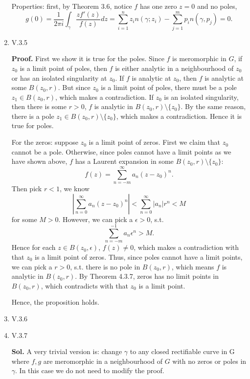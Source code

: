 \documentclass{article}%
\begin{document}
\begin{enumerate}
Properties: first, by Theorem 3.6, notice $f$ has one zero $z = 0$ and no poles,
$$
g(0) = \frac{1}{2\pi i}\int_{\gamma}\frac{zf'(z)}{f(z)}dz = \sum_{i=1}^{n}z_i n(\gamma; z_i) - \sum_{j=1}^{m}p_i n(\gamma, p_j) = 0.
$$

\item V.3.5

\textbf{Proof.}
First we show it is true for the poles. Since $f$ is meromorphic in $G$, if $z_0 $ is a limit point of poles, then $f$ is either analytic in a neighbourhood of $z_0 $ or has an isolated singularity at $z_0 $. If $f$ is analytic at $z_0 $, then $f$ is analytic at some $B(z_0, r)$. But since $z_0 $ is a limit point of poles, there must be a pole $z_1\in B(z_0, r)$, which makes a contradiction. If $z_0 $ is an isolated singularity, then there is some $r > 0$, $f$ is analytic in $B(z_0, r)\setminus\{z_0\}$. By the same reason, there is a pole $z_1\in B(z_0, r)\setminus\{z_0\}$, which makes a contradiction. Hence it is true for poles.

For the zeros: suppose $z_0 $ is a limit point of zeros. First we claim that $z_0 $ cannot be a pole. Otherwise, since poles cannot have a limit points as we have shown above, $f$ has a Laurent expansion in some $B(z_0, r)\setminus\{z_0\}$:
$$
f(z) = \sum_{n=-m}^{\infty}a_n(z-z_0)^n.
$$
Then pick $r < 1$, we know
$$
\left|\sum_{n=0}^{\infty}a_n (z-z_0)^n\right| < \sum_{n=0}^{\infty}|a_n|r^n < M
$$
for some $M > 0$. However, we can pick a $\epsilon > 0$, s.t. 
$$
\sum_{n=-m}^{-1}a_n\epsilon^n > M.
$$
Hence for each $z\in B(z_0, \epsilon)$, $f(z)\ne 0$, which makes a contradiction with that $z_0 $ is a limit point of zeros. Thus, since poles cannot have a limit points, we can pick a $r > 0$, s.t. there is no pole in $B(z_0, r)$, which means $f$ is analytic in $B(z_0, r)$. By Theorem 4.3.7, zeros has no limit points in $B(z_0, r)$, which contradicts with that $z_0 $ is a limit point.

Hence, the proposition holds.

\item V.3.6



\item V.3.7

\textbf{Sol.} A very trivial version is: change $\gamma$ to any closed rectifiable curve in G where $f, g$ are meromorphic in a neighbourhood of $G$ with no zeros or poles in $\gamma$. In this case we do not need to modify the proof.




\end{enumerate}
\end{document}
